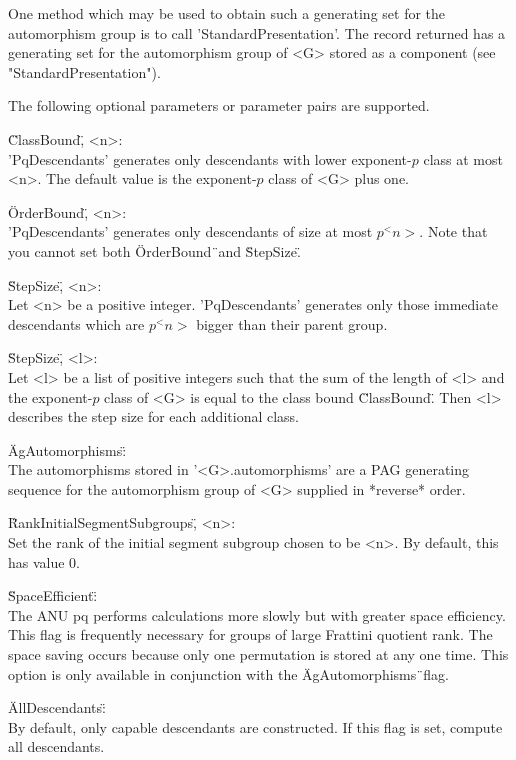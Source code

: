 One method  which  may be  used  to obtain such a generating set  for the
automorphism  group  is  to  call  'StandardPresentation'.   The record
returned has a generating set for the automorphism group of <G> stored as
a component (see "StandardPresentation").

The following optional parameters or parameter pairs are supported.

\"ClassBound\", <n>: \\
    'PqDescendants' generates  only  descendants  with lower exponent-$p$
    class  at most  <n>.  The default value is  the exponent-$p$ class of
    <G> plus one.

\"OrderBound\", <n>: \\
    'PqDescendants' generates only descendants of  size at  most $p^<n>$.
    Note that you cannot set both \"OrderBound\"\ and \"StepSize\".

\"StepSize\", <n>: \\
    Let <n> be a  positive integer.  'PqDescendants' generates only those
    immediate  descendants  which are $p^<n>$  bigger  than  their parent
    group.

\"StepSize\", <l>: \\
    Let <l> be a  list of  positive  integers such that  the  sum  of the
    length of <l> and the exponent-$p$ class of <G> is equal to the class
    bound \"ClassBound\".  Then  <l> describes  the  step size  for  each
    additional class.

\"AgAutomorphisms\": \\
    The automorphisms stored in '<G>.automorphisms' are  a PAG generating
    sequence for  the  automorphism group  of  <G> supplied in  *reverse*
    order.

\"RankInitialSegmentSubgroups\", <n>: \\
    Set the rank  of the  initial  segment  subgroup chosen to  be <n>.
    By default, this has value 0.

\"SpaceEfficient\": \\
    The ANU  pq performs  calculations  more slowly but with greater space
    efficiency.
    This  flag is  frequently  necessary  for  groups of  large  Frattini
    quotient rank.  The space  saving occurs because only one permutation
    is  stored at  any  one  time.   This option  is  only  available  in
    conjunction with the \"AgAutomorphisms\"\ flag.

\"AllDescendants\": \\
    By default, only capable descendants are constructed. If this flag
    is set, compute all descendants.

